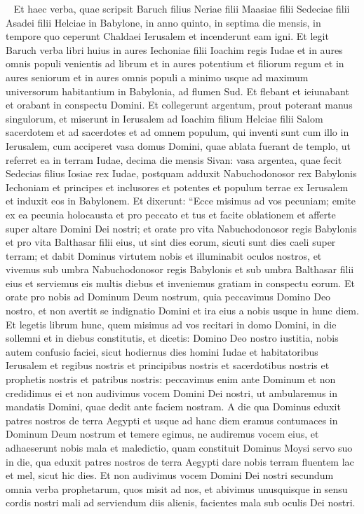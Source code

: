 
\begin{biblechapter}   
\verse Et haec verba, quae scripsit Baruch filius Neriae filii Maasiae filii Sedeciae filii Asadei filii Helciae in Babylone, 
\verse in anno quinto, in septima die mensis, in tempore quo ceperunt Chaldaei Ierusalem et incenderunt eam igni. 
\verse Et legit Baruch verba libri huius in aures Iechoniae filii Ioachim regis Iudae et in aures omnis populi venientis ad librum 
\verse et in aures potentium et filiorum regum et in aures seniorum et in aures omnis populi a minimo usque ad maximum universorum habitantium in Babylonia, ad flumen Sud. 
\verse Et flebant et ieiunabant et orabant in conspectu Domini. 
\verse Et collegerunt argentum, prout poterant manus singulorum, 
\verse et miserunt in Ierusalem ad Ioachim filium Helciae filii Salom sacerdotem et ad sacerdotes et ad omnem populum, qui inventi sunt cum illo in Ierusalem, 
\verse cum acciperet vasa domus Domini, quae ablata fuerant de templo, ut referret ea in terram Iudae, decima die mensis Sivan: vasa argentea, quae fecit Sedecias filius Iosiae rex Iudae, 
\verse postquam adduxit Nabuchodonosor rex Babylonis Iechoniam et principes et inclusores et potentes et populum terrae ex Ierusalem et induxit eos in Babylonem. 
\verse Et dixerunt: “Ecce misimus ad vos pecuniam; emite ex ea pecunia holocausta et pro peccato et tus et facite oblationem et afferte super altare Domini Dei nostri; 
\verse et orate pro vita Nabuchodonosor regis Babylonis et pro vita Balthasar filii eius, ut sint dies eorum, sicuti sunt dies caeli super terram; 
\verse et dabit Dominus virtutem nobis et illuminabit oculos nostros, et vivemus sub umbra Nabuchodonosor regis Babylonis et sub umbra Balthasar filii eius et serviemus eis multis diebus et inveniemus gratiam in conspectu eorum. 
\verse Et orate pro nobis ad Dominum Deum nostrum, quia peccavimus Domino Deo nostro, et non avertit se indignatio Domini et ira eius a nobis usque in hunc diem. 
\verse Et legetis librum hunc, quem misimus ad vos recitari in domo Domini, in die sollemni et in diebus constitutis, 
\verse et dicetis: Domino Deo nostro iustitia, nobis autem confusio faciei, sicut hodiernus dies homini Iudae et habitatoribus Ierusalem 
\verse et regibus nostris et principibus nostris et sacerdotibus nostris et prophetis nostris et patribus nostris: 
\verse peccavimus enim ante Dominum et non credidimus ei 
\verse et non audivimus vocem Domini Dei nostri, ut ambularemus in mandatis Domini, quae dedit ante faciem nostram. 
\verse A die qua Dominus eduxit patres nostros de terra Aegypti et usque ad hanc diem eramus contumaces in Dominum Deum nostrum et temere egimus, ne audiremus vocem eius, 
\verse et adhaeserunt nobis mala et maledictio, quam constituit Dominus Moysi servo suo in die, qua eduxit patres nostros de terra Aegypti dare nobis terram fluentem lac et mel, sicut hic dies. 
\verse Et non audivimus vocem Domini Dei nostri secundum omnia verba prophetarum, quos misit ad nos, 
\verse et abivimus unusquisque in sensu cordis nostri mali ad serviendum diis alienis, facientes mala sub oculis Dei nostri. 
\end{biblechapter}

